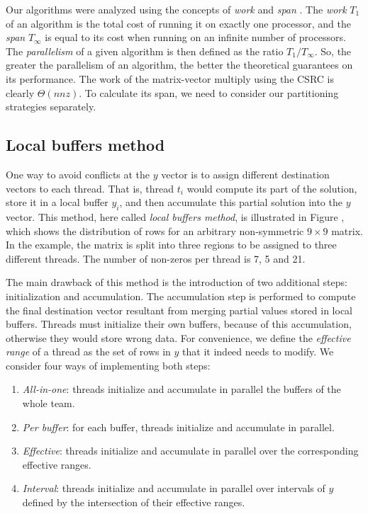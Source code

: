 \documentclass[11pt]{article}
\begin{document}
Our algorithms were analyzed using the concepts of \textit{work} and
\textit{span} \cite[Ch.~27]{CLRS09a}.  The \textit{work} $T_{1}$ of an
algorithm is the total cost of running it on exactly one processor, and the
\textit{span} $T_{\infty}$ is equal to its cost when running on an infinite
number of processors.  The \textit{parallelism} of a given algorithm is then
defined as the ratio $T_{1}/T_{\infty}$.  So, the greater the parallelism of
an algorithm, the better the theoretical guarantees on its performance.  The
work of the matrix-vector multiply using the CSRC is clearly $\Theta(nnz)$.  To
calculate its span, we need to consider our partitioning strategies
separately.

\subsection{Local buffers method}

One way to avoid conflicts at the $y$ vector is to assign different
destination vectors to each thread.  That is, thread $t_i$ would compute its
part of the solution, store it in a local buffer $y_i$, and then accumulate
this partial solution into the $y$ vector.  This method, here called
\textit{local buffers method}, is illustrated in
Figure , which shows the distribution of rows for an
arbitrary non-symmetric $9 \times 9$ matrix.  In the example, the matrix is
split into three regions to be assigned to three different threads.  The number of non-zeros per thread is 7, 5 and
21.

The main drawback of this method is the introduction of two additional steps: initialization and accumulation.
The accumulation step is performed to compute the final destination vector resultant from merging partial values stored in local buffers.
Threads must initialize their own buffers, because of this accumulation, otherwise they would store wrong data.
For convenience, we define the \textit{effective range} of a thread as the set of rows in $y$ that it indeed needs to modify.
We consider four ways of implementing both steps:

\begin{enumerate}

\item \textit{All-in-one}: threads initialize and accumulate in parallel the buffers of the whole team.

\item \textit{Per buffer}: for each buffer, threads initialize and accumulate in parallel.

\item \textit{Effective}: threads initialize and accumulate in parallel over the corresponding effective ranges.

\item \textit{Interval}: threads initialize and accumulate in parallel over intervals of $y$ defined by the intersection of their effective ranges.

\end{enumerate}
\end{document}
